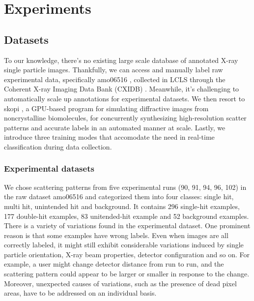 \section{Experiments}

\subsection{Datasets}

To our knowledge, there's no existing large scale database of annotated X-ray
single particle images.  Thankfully, we can access and manually label raw
experimental data, specifically amo06516 \cite{liDiffractionDataAerosolized2020},
collected in LCLS through the Coherent X-ray Imaging Data Bank (CXIDB)
\cite{maiaCoherentXrayImaging2012}.  Meanwhile, it's challenging to
automatically scale up annotations for experimental datasets.  We then resort to
skopi \cite{peckSkopiSimulationPackage2021}, a GPU-based program for simulating
diffractive images from noncrystalline biomolecules, for concurrently
synthesizing high-resolution scatter patterns and accurate labels in an
automated manner at scale.  Lastly, we introduce three training modes that
accomodate the need in real-time classification during data collection.  


\subsubsection{Experimental datasets}


We chose scattering patterns from five experimental runs (90, 91, 94, 96, 102)
in the raw dataset amo06516 and categorized them into four classes: single hit,
multi hit, unintended hit and background.  It contains 296 single-hit examples,
177 double-hit examples, 83 unitended-hit example and 52 background examples.
There is a variety of variations found in the experimental dataset.  One
prominent reason is that some examples have wrong labels. Even when images are
all correctly labeled, it might still exhibit considerable variations induced by
single particle orientation, X-ray beam properties, detector configuration and
so on.  For example, a user might change detector distance from run to run, and
the scattering pattern could appear to be larger or smaller in response to the
change. Moreover, unexpected causes of variations, such as the presence of dead
pixel areas, have to be addressed on an individual basis.  



